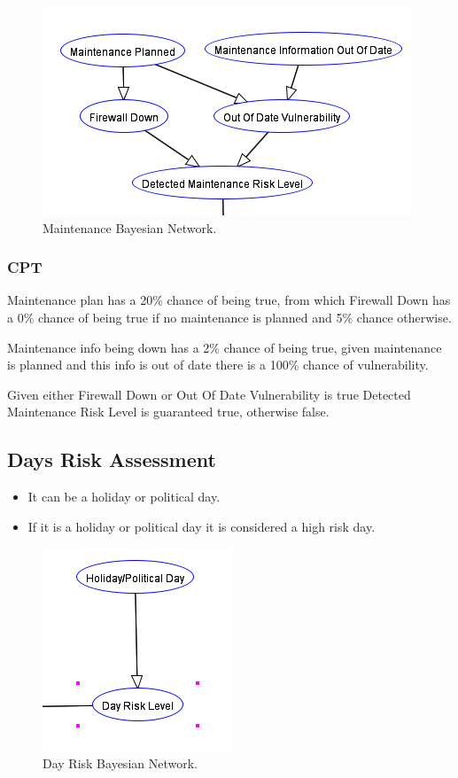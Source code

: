 \documentclass[10pt,a4paper]{article}
\begin{document}
\begin{figure}
\centering
  \includegraphics{maintenance_network.png}
  \caption{Maintenance Bayesian Network.}
  \label{fig:maintenance_network}
\end{figure}

\subsubsection{CPT}

Maintenance plan has a 20\% chance of being true, from which Firewall Down has a 0\% chance of being true if no maintenance is planned and 5\% chance otherwise.

Maintenance info being down has a 2\% chance of being true, given maintenance is planned and this info is out of date there is a 100\% chance of vulnerability.

Given either Firewall Down or Out Of Date Vulnerability is true Detected Maintenance Risk Level is guaranteed true, otherwise false.

\subsection{Days Risk Assessment}

\begin{itemize}
\item It can be a holiday or political day.
\item If it is a holiday or political day it is considered a high risk day.
\end{itemize}

\begin{figure}
\centering
  \includegraphics{day_network.png}
  \caption{Day Risk Bayesian Network.}
  \label{fig:day_network}
\end{figure}
\end{document}
